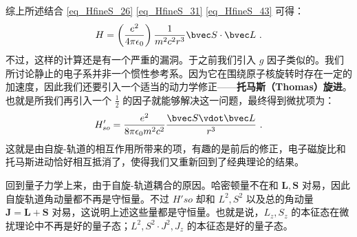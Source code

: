 综上所述结合 \autoref{eq_HfineS_26} \autoref{eq_HfineS_31} \autoref{eq_HfineS_43} 可得：
\begin{equation}
H=\left(\frac{e^2}{4\pi\epsilon_0}\right)\frac{1}{m^2c^2r^3}\bvec S \cdot \bvec L~.
\end{equation}
不过，这样的计算还是有一个严重的漏洞。于之前我们引入 $g$ 因子类似的。我们所讨论静止的电子系并非一个惯性参考系。因为它在围绕原子核旋转时存在一定的加速度，因此我们还要引入一个适当的动力学修正——\textbf{托马斯（Thomas）旋进}。也就是所我们再引入一个 $\frac{1}{2}$ 的因子就能够解决这一问题，最终得到微扰项为：
\begin{equation}
H'_{so} = \frac{e^2}{8\pi \epsilon_0 m^2 c^2} \frac{\bvec S \vdot \bvec L}{r^3}~.
\end{equation}
这就是由自旋-轨道的相互作用所带来的项，有趣的是前后的修正，电子磁旋比和托马斯进动恰好相互抵消了，使得我们又重新回到了经典理论的结果。

回到量子力学上来，由于自旋-轨道耦合的原因。哈密顿量不在和 $\mathbf{L,S}$ 对易，因此自旋轨道角动量都不再是守恒量。不过 $H'{so}$ 却和 $L^2,S^2$ 以及总的角动量 $\mathbf{J=L+S}$ 对易，这说明上述这些量都是守恒量。也就是说，$L_z,S_z$ 的本征态在微扰理论中不再是好的量子态；$L^2,S^2\cdot J^2,J_z$ 的本征态是好的量子态。

